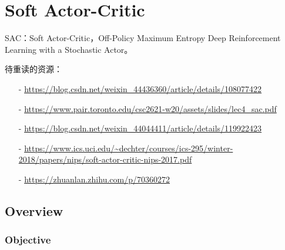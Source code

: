 ﻿\chapter{Soft Actor-Critic}

SAC：Soft Actor-Critic，Off-Policy Maximum Entropy Deep Reinforcement 
Learning with a Stochastic Actor。


待重读的资源：
\begin{itemize}
\setlength{\parskip}{0pt}
\item[-]
\url{https://blog.csdn.net/weixin_44436360/article/details/108077422}

\item[-]
\url{https://www.pair.toronto.edu/csc2621-w20/assets/slides/lec4_sac.pdf}

\item[-]
\url{https://blog.csdn.net/weixin_44044411/article/details/119922423}

\item[-]
\url{https://www.ics.uci.edu/~dechter/courses/ics-295/winter-2018/papers/nips/soft-actor-critic-nips-2017.pdf}

\item[-]
\url{https://zhuanlan.zhihu.com/p/70360272}
\end{itemize}

\section{Overview}


\subsection{Objective}

